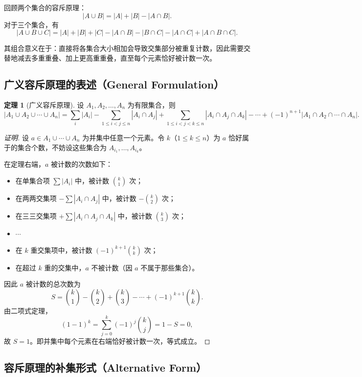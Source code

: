 \documentclass[UTF8,11pt,a4paper]{ctexbook}   %
\theoremstyle{definition}
\newtheorem{theorem}{定理}[section]
\begin{document}
回顾两个集合的容斥原理：
\[
|A\cup B|=|A|+|B|-|A\cap B|.
\]
对于三个集合，有
\[
|A\cup B\cup C|=|A|+|B|+|C|-|A\cap B|-|B\cap C|-|A\cap C|+|A\cap B\cap C|.
\]

其组合意义在于：直接将各集合大小相加会导致交集部分被重复计数，因此需要交替地减去多重重叠、加上更高重重叠，直至每个元素恰好被计数一次。

\subsection{广义容斥原理的表述（General Formulation）}

\begin{theorem}[广义容斥原理]
\label{thm:generalized-iep}
设 $A_1,A_2,\dots,A_n$ 为有限集合，则
\[
|A_1\cup A_2\cup\cdots\cup A_n|
=\sum_{i}|A_i|
-\sum_{1\le i<j\le n}|A_i\cap A_j|
+\sum_{1\le i<j<k\le n}|A_i\cap A_j\cap A_k|
-\cdots
+(-1)^{n+1}|A_1\cap A_2\cap\cdots\cap A_n|.
\]
\end{theorem}

\begin{proof}[证明]
设 $a\in A_1\cup\cdots\cup A_n$ 为并集中任意一个元素。令 $k$（$1\le k\le n$）为 $a$ 恰好属于的集合个数，不妨设这些集合为 $A_{i_1},\dots,A_{i_k}$。

在定理右端，$a$ 被计数的次数如下：
\begin{itemize}
    \item 在单集合项 $\sum|A_i|$ 中，被计数 $\binom{k}{1}$ 次；
    \item 在两两交集项 $-\sum|A_i\cap A_j|$ 中，被计数 $-\binom{k}{2}$ 次；
    \item 在三三交集项 $+\sum|A_i\cap A_j\cap A_k|$ 中，被计数 $\binom{k}{3}$ 次；
    \item $\cdots$
    \item 在 $k$ 重交集项中，被计数 $(-1)^{k+1}\binom{k}{k}$ 次；
    \item 在超过 $k$ 重的交集中，$a$ 不被计数（因 $a$ 不属于那些集合）。
\end{itemize}

因此 $a$ 被计数的总次数为
\[
S=\binom{k}{1}-\binom{k}{2}+\binom{k}{3}-\cdots+(-1)^{k+1}\binom{k}{k}.
\]
由二项式定理，
\[
(1-1)^k=\sum_{j=0}^{k}(-1)^j\binom{k}{j}=1-S=0,
\]
故 $S=1$。即并集中每个元素在右端恰好被计数一次，等式成立。
\end{proof}

\subsection{容斥原理的补集形式（Alternative Form）}
\end{document}
